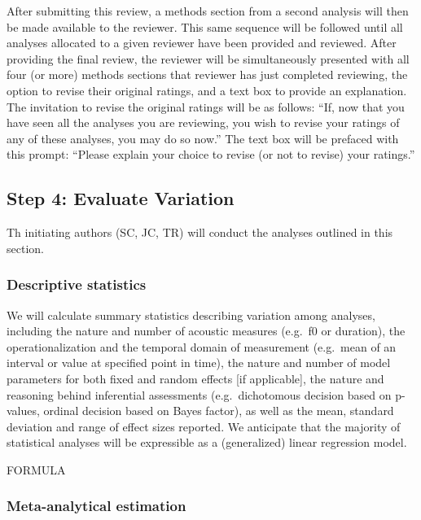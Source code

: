 \documentclass[
  english,
  man]{apa6}
\begin{document}
After submitting this review, a methods section from a second analysis will then be made available to the reviewer.
This same sequence will be followed until all analyses allocated to a given reviewer have been provided and reviewed.
After providing the final review, the reviewer will be simultaneously presented with all four (or more) methods sections that reviewer has just completed reviewing, the option to revise their original ratings, and a text box to provide an explanation.
The invitation to revise the original ratings will be as follows: ``If, now that you have seen all the analyses you are reviewing, you wish to revise your ratings of any of these analyses, you may do so now.''
The text box will be prefaced with this prompt: ``Please explain your choice to revise (or not to revise) your ratings.''

\hypertarget{step-4-evaluate-variation}{%
\subsection{Step 4: Evaluate Variation}\label{step-4-evaluate-variation}}

Th initiating authors (SC, JC, TR) will conduct the analyses outlined in this section.

\hypertarget{descriptive-statistics}{%
\subsubsection{Descriptive statistics}\label{descriptive-statistics}}

We will calculate summary statistics describing variation among analyses, including the nature and number of acoustic measures (e.g.~f0 or duration), the operationalization and the temporal domain of measurement (e.g.~mean of an interval or value at specified point in time), the nature and number of model parameters for both fixed and random effects {[}if applicable{]}, the nature and reasoning behind inferential assessments (e.g.~dichotomous decision based on p-values, ordinal decision based on Bayes factor), as well as the mean, standard deviation and range of effect sizes reported.
We anticipate that the majority of statistical analyses will be expressible as a (generalized) linear regression model.

FORMULA

\hypertarget{s:meta-est}{%
\subsubsection{Meta-analytical estimation}\label{s:meta-est}}
\end{document}
